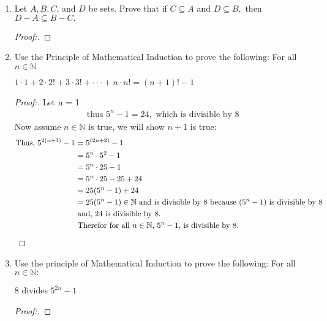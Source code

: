 \documentclass[11pt]{article}
\begin{document}
\begin{enumerate}
    \item Let $A,B,C$, and $D$ be sets. Prove that if $C \subseteq A$ and $D \subseteq B,$ then $D-A\subseteq B-C.$
        \begin{proof}[Proof:\nopunct]
        \end{proof}
        
\pagebreak
    \item Use the Principle of Mathematical Induction to prove the following: \newline
    For all $n \in \mathbb{N}$
    \begin{center}
        $1\cdot1+2\cdot2!+3\cdot3!+\cdot \cdot \cdot + n\cdot n!=(n+1)!-1$
    \end{center}
        \begin{proof}[Proof:\nopunct]
            Let n = 1
            \begin{align*}
                \text{ thus $5^n-1 = 24,$ which is divisible by 8}
            \end{align*}
                Now assume $n \in \mathbb{N}$ is true, we will show $n+1$ is true:
            \begin{align*}
                \text{Thus, $5^{2(n+1)}-1 $ } 
                & \text{$ = 5^{(2n+2)} -1$} \\
                & \text{$ = 5^n\cdot 5^2 - 1$} \\
                & \text{$ = 5^n\cdot 25 - 1$} \\
                & \text{$ = 5^n\cdot 25 -25+24$} \\
                & \text{$ = 25(5^n -1)+24$} \\
                & \text{$ = 25(5^n - 1) \in \mathbb{N}$ and is divisible by 8 because $(5^n - 1)$ is divisible by 8} \\
                & \text{and, 24 is divisible by 8.} \\
                & \text{Therefor for all $n\in \mathbb{N}$, $5^n - 1,$ is divisible by 8.}
            \end{align*}
        \end{proof}
        
    \item Use the principle of Mathematical Induction to prove the following: For all $n \in \mathbb{N}:$
    \begin{center}
        8 divides $5^{2n} -1$
    \end{center}
        \begin{proof}[Proof:\nopunct]
        \end{proof}
        

\end{enumerate}
\end{document}
